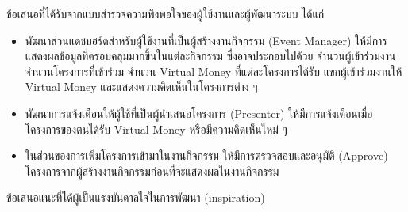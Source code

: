 ข้อเสนอที่ได้รับจากแบบสำรวจความพึงพอใจของผู้ใช้งานและผู้พัฒนาระบบ ได้แก่
\begin{itemize}
      \item พัฒนาส่วนแดชบฮร์ดสำหรับผู้ใช้งานที่เป็นผู้สร้างงานกิจกรรม (Event Manager) ให้มีการแสดงผลข้อมูลที่ครอบคลุมมากขึ้นในแต่ละกิจกรรม ซึ่งอาจประกอบไปด้วย จำนวนผู้เข้าร่วมงาน จำนวนโครงการที่เข้าร่วม จำนวน Virtual Money ที่แต่ละโครงการได้รับ แขกผู้เข้าร่วมงานให้ Virtual Money และแสดงความคิดเห็นในโครงการต่าง ๆ
      \item พัฒนาการแจ้งเตือนให้ผู้ใช้ที่เป็นผู้นำเสนอโครงการ (Presenter) ให้มีการแจ้งเตือนเมื่อโครงการของตนได้รับ Virtual Money หรือมีความคิดเห็นใหม่ ๆ
      \item ในส่วนของการเพิ่มโครงการเข้ามาในงานกิจกรรม ให้มีการตรวจสอบและอนุมัติ (Approve) โครงการจากผู้สร้างงานกิจกรรมก่อนที่จะแสดงผลในงานกิจกรรม
\end{itemize}

ข้อเสนอแนะที่ได้ผู้เป็นแรงบันดาลใจในการพัฒนา (inspiration)


